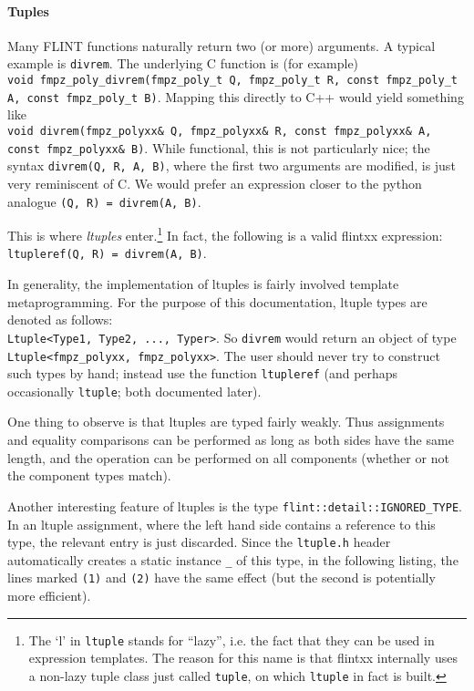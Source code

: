 \documentclass[a4paper,10pt]{book}
\newcommand{\code}{\lstinline}
\begin{document}
{{\paragraph{Tuples}

Many FLINT functions naturally return two (or more) arguments. A typical example
is \code{divrem}. The underlying C function is (for example)\\
\code{void fmpz_poly_divrem(fmpz_poly_t Q, fmpz_poly_t R, const fmpz_poly_t A, const fmpz_poly_t B)}.
Mapping this directly to C++ would yield something like\\
\code{void divrem(fmpz_polyxx& Q, fmpz_polyxx& R, const fmpz_polyxx& A, const fmpz_polyxx& B)}.
While functional, this is not particularly nice; the syntax
\code{divrem(Q, R, A, B)}, where the first two arguments are modified, is just
very reminiscent of C. We would prefer an expression closer to the
python analogue \code{(Q, R) = divrem(A, B)}.

This is where \emph{ltuples} enter.\footnote{The `l' in \code{ltuple} stands for
``lazy'', i.e. the fact that they can be used in expression templates.
The reason for this name
is that flintxx internally uses a non-lazy tuple class just
called \code{tuple}, on which \code{ltuple} in fact is built.}
In fact, the following is a valid
flintxx expression:\\
\code{ltupleref(Q, R) = divrem(A, B)}.

In generality, the implementation of ltuples is fairly involved template
metaprogramming. For the purpose of this documentation, ltuple types are denoted
as follows:\\
\code{Ltuple<Type1, Type2, ..., Typer>}. So \code{divrem} would
return an object of type\\
\code{Ltuple<fmpz_polyxx, fmpz_polyxx>}. The user
should never try to construct such types by hand; instead use the function
\code{ltupleref} (and perhaps occasionally \code{ltuple}; both documented
later).

One thing to observe is that ltuples are typed fairly weakly. Thus assignments
and equality comparisons can be performed as long as both sides have the same
length, and the operation can be performed on all components (whether or not the
component types match).

Another interesting feature of ltuples is the type
\code{flint::detail::IGNORED_TYPE}.
In an ltuple assignment, where the left hand side contains a reference to this
type, the relevant entry is just discarded. Since the \code{ltuple.h} header
automatically creates a static instance \code{_} of this type,
in the following listing, the
lines marked \code{(1)} and \code{(2)} have the same effect (but the second is
potentially more efficient).

}}
\end{document}
